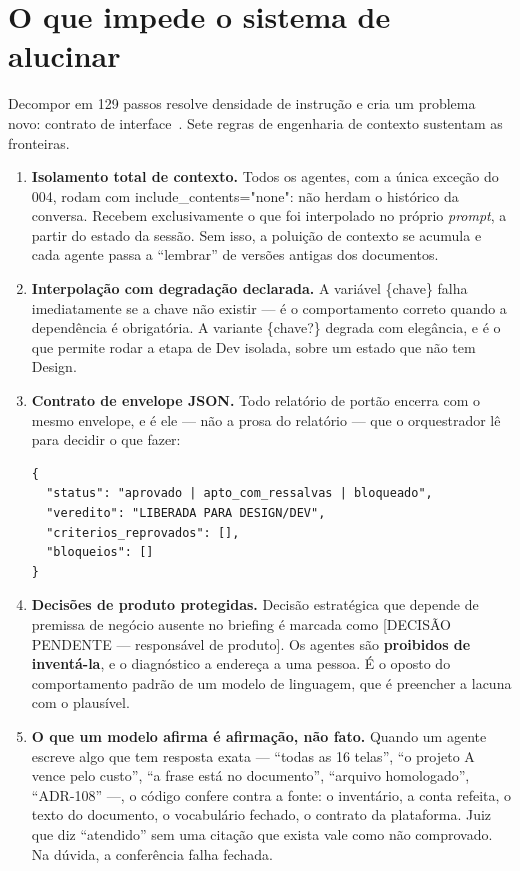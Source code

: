 \documentclass[11pt,a4paper]{article}
\newcommand{\cod}[1]{{\ttfamily\small #1}}
\begin{document}
\section{O que impede o sistema de alucinar}
\label{sec:anti}

Decompor em 129 passos resolve densidade de instrução e cria um problema novo: contrato de interface~\cite{cemri2025}. Sete regras de engenharia de contexto sustentam as fronteiras.

\begin{enumerate}
  \item \textbf{Isolamento total de contexto.} Todos os agentes, com a única exceção do 004, rodam com \cod{include\_\allowbreak contents="none"}: não herdam o histórico da conversa. Recebem exclusivamente o que foi interpolado no próprio \emph{prompt}, a partir do estado da sessão. Sem isso, a poluição de contexto se acumula e cada agente passa a ``lembrar'' de versões antigas dos documentos.
  \item \textbf{Interpolação com degradação declarada.} A variável \cod{\{chave\}} falha imediatamente se a chave não existir --- é o comportamento correto quando a dependência é obrigatória. A variante \cod{\{chave?\}} degrada com elegância, e é o que permite rodar a etapa de Dev isolada, sobre um estado que não tem Design.
  \item \textbf{Contrato de envelope JSON.} Todo relatório de portão encerra com o mesmo envelope, e é ele --- não a prosa do relatório --- que o orquestrador lê para decidir o que fazer:
\begin{lstlisting}
{
  "status": "aprovado | apto_com_ressalvas | bloqueado",
  "veredito": "LIBERADA PARA DESIGN/DEV",
  "criterios_reprovados": [],
  "bloqueios": []
}
\end{lstlisting}
  \item \textbf{Decisões de produto protegidas.} Decisão estratégica que depende de premissa de negócio ausente no briefing é marcada como \cod{[DECISÃO PENDENTE — responsável de produto]}. Os agentes são \textbf{proibidos de inventá-la}, e o diagnóstico a endereça a uma pessoa. É o oposto do comportamento padrão de um modelo de linguagem, que é preencher a lacuna com o plausível.
  \item \textbf{O que um modelo afirma é afirmação, não fato.} Quando um agente escreve algo que tem resposta exata --- ``todas as 16 telas'', ``o projeto A vence pelo custo'', ``a frase está no documento'', ``arquivo homologado'', ``ADR-108'' ---, o código confere contra a fonte: o inventário, a conta refeita, o texto do documento, o vocabulário fechado, o contrato da plataforma. Juiz que diz ``atendido'' sem uma citação que exista vale como não comprovado. Na dúvida, a conferência falha fechada.

\end{enumerate}
\end{document}
